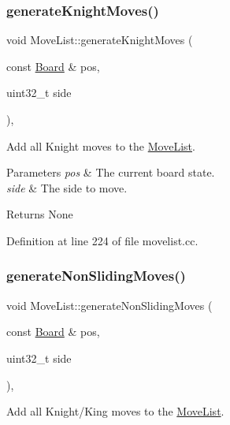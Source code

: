 \subsubsection{\texorpdfstring{generate\+Knight\+Moves()}{generateKnightMoves()}}
{\footnotesize\ttfamily void Move\+List\+::generate\+Knight\+Moves (\begin{DoxyParamCaption}\item[{const \mbox{\hyperlink{classBoard}{Board}} \&}]{pos,  }\item[{uint32\+\_\+t}]{side }\end{DoxyParamCaption})\hspace{0.3cm}{\ttfamily [private]}, {\ttfamily [noexcept]}}



Add all Knight moves to the \mbox{\hyperlink{classMoveList}{Move\+List}}. 


\begin{DoxyParams}{Parameters}
{\em pos} & The current board state. \\
\hline
{\em side} & The side to move. \\
\hline
\end{DoxyParams}
\begin{DoxyReturn}{Returns}
None 
\end{DoxyReturn}


Definition at line 224 of file movelist.\+cc.

\mbox{\label{classMoveList_a56da1abbedf5d6c23b1e321740ecfae9}} 
\subsubsection{\texorpdfstring{generate\+Non\+Sliding\+Moves()}{generateNonSlidingMoves()}}
{\footnotesize\ttfamily void Move\+List\+::generate\+Non\+Sliding\+Moves (\begin{DoxyParamCaption}\item[{const \mbox{\hyperlink{classBoard}{Board}} \&}]{pos,  }\item[{uint32\+\_\+t}]{side }\end{DoxyParamCaption})\hspace{0.3cm}{\ttfamily [private]}, {\ttfamily [noexcept]}}



Add all Knight/\+King moves to the \mbox{\hyperlink{classMoveList}{Move\+List}}. 


